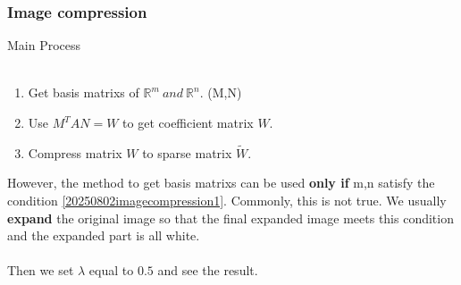 \documentclass{beamer} %
\begin{document}
\begin{frame}
	\frametitle{Image compression}
	{\LARGE Main Process}\\ \ \\
	\begin{enumerate}
		\item Get basis matrixs of $\mathbb{R}^{m}\ and\ \mathbb{R}^{n}$. (M,N)
		\item Use $M^{T}AN=W$ to get coefficient matrix $W$.
		\item Compress matrix $W$ to sparse matrix $\widetilde{W}$.
	\end{enumerate}
	However, the method to get basis matrixs can be used \textbf{only if} m,n satisfy the condition \eqref{20250802imagecompression1}. Commonly, this is not true. We usually \textbf{expand} the original image so that the final expanded image meets this condition and the expanded part is all white.\\\ \\
	{\color{blue}Then we set $\lambda$ equal to $0.5$ and see the result.}
\end{frame}
\end{document}
